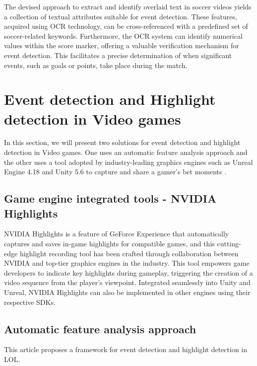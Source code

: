     The devised approach to extract and identify overlaid text in soccer videos yields a collection of textual attributes suitable for event detection. These features, acquired using \gls{OCR} technology, can be cross-referenced with a predefined set of soccer-related keywords. Furthermore, the \gls{OCR} system can identify numerical values within the score marker, offering a valuable verification mechanism for event detection. This facilitates a precise determination of when significant events, such as goals or points, take place during the match.

\section{Event detection and Highlight detection in Video games}

    In this section, we will present two solutions for event detection and highlight detection in Video games. One uses an automatic feature analysis approach \cite{BroadcatedGames_analysis_LOL} and the other uses a tool adopted by industry-leading graphics engines such as  Unreal Engine 4.18 and Unity 5.6 to capture and share a gamer's bet moments \cite{NVIDIA_GeForce}.  

\subsection*{Game engine integrated tools - NVIDIA Highlights}
    
    NVIDIA Highlights is a feature of GeForce Experience \cite{NVIDIA_GeForce} that automatically captures and saves in-game highlights for compatible games, and this cutting-edge highlight recording tool has been crafted through collaboration between NVIDIA and top-tier graphics engines in the industry. This tool empowers game developers to indicate key highlights during gameplay, triggering the creation of a video sequence from the player's viewpoint. Integrated seamlessly into Unity and Unreal, NVIDIA Highlights can also be implemented in other engines using their respective SDKs.

\subsection*{Automatic feature analysis approach}

    This article \cite{BroadcatedGames_analysis_LOL} proposes a framework for event detection and highlight detection in \gls{LOL}. 
    
